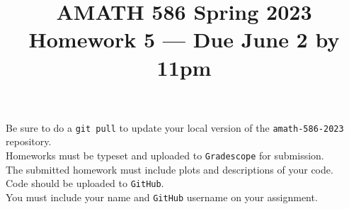 \documentclass[10pt]{amsart}
\begin{document}
\pagestyle{empty}

\newcommand{\mline}{\vspace{.2in}\hrule\vspace{.2in}}


\title{\bf { AMATH 586 Spring 2023 \\ Homework 5 ---
    Due June 2
   by 11pm} }
\maketitle
\begin{center} Be sure to do a {\tt git pull} to update your local
  version of the {\tt amath-586-2023} repository.\\  Homeworks must be
  typeset and uploaded to {\tt Gradescope} for submission.\\
  The submitted homework must include plots and descriptions of your code.\\
  Code should be uploaded to {\tt GitHub}.\\
  You must include your name and {\tt GitHub} username on your assignment.
  \end{center}
\end{document}
